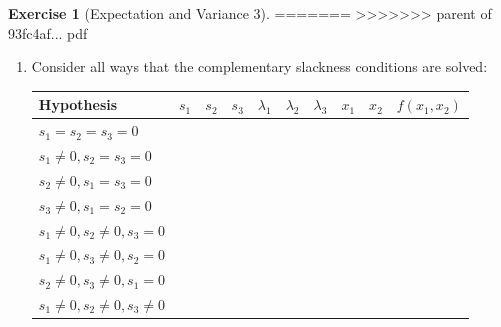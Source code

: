 \documentclass[]{book}
\providecommand{\tightlist}{%
  \setlength{\itemsep}{0pt}\setlength{\parskip}{0pt}}
\theoremstyle{definition}
\theoremstyle{definition}
\theoremstyle{definition}
\newtheorem{exercise}{Exercise}[chapter]
\theoremstyle{remark}
\begin{document}
\begin{exercise}[Expectation and Variance 3]
\protect\hypertarget{exr:expvar3}{}{\label{exr:expvar3} {} }
=======
>>>>>>> parent of 93fc4af... pdf

\begin{enumerate}
\def\labelenumi{\arabic{enumi}.}
\setcounter{enumi}{3}
\tightlist
\item
  Consider all ways that the complementary slackness conditions are solved:

  \begin{center}
  \begin{tabular}{|l|cccccccc|c|}
  \hline
  Hypothesis & $s_1$ & $s_2$ & $s_3$ & $\lambda_1$ & $\lambda_2$ & $\lambda_3$ & $x_1$ & $x_2$ & $f(x_1, x_2)$\\
  \hline
  $s_1 = s_2 = s_3 = 0$ & \multicolumn{8}{l|}{\phantom{No solution}} & \\
  $s_1 \neq 0, s_2 = s_3 = 0$ & \phantom{2} & \phantom{0} & \phantom{0} & \phantom{0} & \phantom{0} & \phantom{0} & \phantom{0} & \phantom{0} & \phantom{0}\\
  $s_2 \neq 0, s_1 = s_3 = 0$ & \phantom{0} & \phantom{2} & \phantom{0} & \phantom{-8} & \phantom{0} & \phantom{-8} & \phantom{4} & \phantom{0} & \phantom{-16}\\
  $s_3 \neq 0, s_1 = s_2 = 0$ & \phantom{0} & \phantom{0} & \phantom{2} & \phantom{-16} & \phantom{-16} & \phantom{0} & \phantom{0} & \phantom{4} & \phantom{-32}\\
  $s_1 \neq 0, s_2 \neq 0, s_3 = 0$ &\multicolumn{8}{l|}{\phantom{No solution}} & \\
  $s_1 \neq 0, s_3 \neq 0, s_2 = 0$ &\multicolumn{8}{l|}{\phantom{No solution}} & \\
  $s_2 \neq 0, s_3 \neq 0, s_1 = 0$ &\phantom{0} & \phantom{$\sqrt{\frac{8}{3}}$} & \phantom{$\sqrt{\frac{4}{3}}$} & \phantom{$-\frac{16}{3}$} & \phantom{0} & \phantom{0} & \phantom{$\frac{8}{3}$}& \phantom{$\frac{4}{3}$} & \phantom{$-\frac{32}{3}$}\\
  $s_1 \neq 0, s_2 \neq 0, s_3 \neq 0$ &\multicolumn{8}{l|}{\phantom{No solution}}& \\
  \hline
  \end{tabular}
  \end{center}
\end{enumerate}


\end{exercise}
\end{document}

